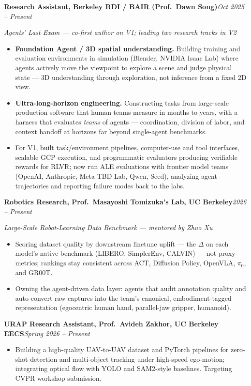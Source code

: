 \documentclass[9pt, letterpaper]{extarticle}
\newcommand{\role}[2]{%
  \vspace{2pt}%
  \noindent\textbf{#1}\hfill\textit{#2}\par\vspace{1pt}%
}
\newcommand{\rolesub}[1]{%
  \noindent\textit{#1}\par\vspace{1pt}%
}
\begin{document}
\role{Research Assistant, Berkeley RDI / BAIR (Prof.\ Dawn Song)}{Oct 2025 -- Present}
\rolesub{Agents' Last Exam --- co-first author on V1; leading two research tracks in V2}
\begin{itemize}
  \item \textbf{Foundation Agent / 3D spatial understanding.} Building training and evaluation environments in simulation (Blender, NVIDIA Isaac Lab) where agents actively move the viewpoint to explore a scene and judge physical state --- 3D understanding through exploration, not inference from a fixed 2D view.
  \item \textbf{Ultra-long-horizon engineering.} Constructing tasks from large-scale production software that human teams measure in months to years, with a harness that evaluates \emph{teams} of agents --- coordination, division of labor, and context handoff at horizons far beyond single-agent benchmarks.
  \item For V1, built task/environment pipelines, computer-use and tool interfaces, scalable GCP execution, and programmatic evaluators producing verifiable rewards for RLVR; now run ALE evaluations with frontier model teams (OpenAI, Anthropic, Meta TBD Lab, Qwen, Seed), analyzing agent trajectories and reporting failure modes back to the labs.
\end{itemize}

\role{Robotics Research, Prof.\ Masayoshi Tomizuka's Lab, UC Berkeley}{2026 -- Present}
\rolesub{Large-Scale Robot-Learning Data Benchmark --- mentored by Zhuo Xu}
\begin{itemize}
  \item Scoring dataset quality by downstream finetune uplift --- the $\Delta$ on each model's native benchmark (LIBERO, SimplerEnv, CALVIN) --- not proxy metrics; rankings stay consistent across ACT, Diffusion Policy, OpenVLA, $\pi_0$, and GR00T.
  \item Owning the agent-driven data layer: agents that audit annotation quality and auto-convert raw captures into the team's canonical, embodiment-tagged representation (egocentric human hand, parallel-jaw gripper, humanoid).
\end{itemize}

\role{URAP Research Assistant, Prof.\ Avideh Zakhor, UC Berkeley EECS}{Spring 2026 -- Present}
\begin{itemize}
  \item Building a high-quality UAV-to-UAV dataset and PyTorch pipelines for zero-shot detection and multi-object tracking under high-speed ego-motion; integrating optical flow with YOLO and SAM2-style baselines. Targeting CVPR workshop submission.
\end{itemize}
\end{document}
